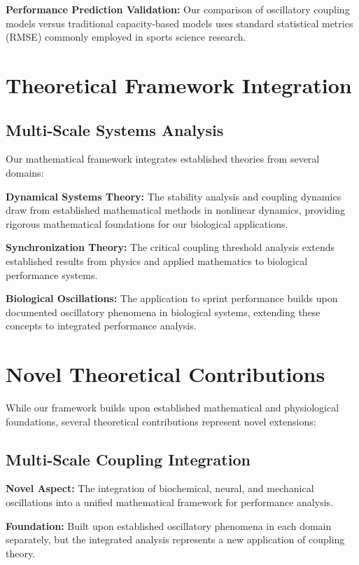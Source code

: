 \documentclass{article}
\begin{document}
\textbf{Performance Prediction Validation:} Our comparison of oscillatory coupling models versus traditional capacity-based models uses standard statistical metrics (RMSE) commonly employed in sports science research.

\section{Theoretical Framework Integration}

\subsection{Multi-Scale Systems Analysis}

Our mathematical framework integrates established theories from several domains:

\textbf{Dynamical Systems Theory:} The stability analysis and coupling dynamics draw from established mathematical methods in nonlinear dynamics, providing rigorous mathematical foundations for our biological applications.

\textbf{Synchronization Theory:} The critical coupling threshold analysis extends established results from physics and applied mathematics to biological performance systems.

\textbf{Biological Oscillations:} The application to sprint performance builds upon documented oscillatory phenomena in biological systems, extending these concepts to integrated performance analysis.

\section{Novel Theoretical Contributions}

While our framework builds upon established mathematical and physiological foundations, several theoretical contributions represent novel extensions:

\subsection{Multi-Scale Coupling Integration}

\textbf{Novel Aspect:} The integration of biochemical, neural, and mechanical oscillations into a unified mathematical framework for performance analysis.

\textbf{Foundation:} Built upon established oscillatory phenomena in each domain separately, but the integrated analysis represents a new application of coupling theory.
\end{document}
